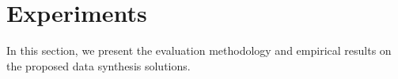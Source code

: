 \documentclass[conference]{IEEEtran}
\begin{document}





\section{Experiments}


In this section, we present the evaluation methodology and empirical results on the proposed data synthesis solutions.  

\end{document}
